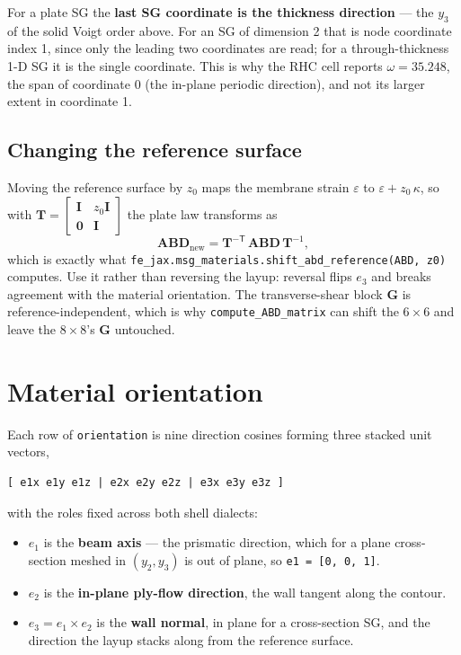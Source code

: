 For a plate SG the \textbf{last SG coordinate is the thickness direction} --- the
$y_3$ of the solid Voigt order above. For an SG of dimension 2 that is node
coordinate index 1, since only the leading two coordinates are read; for a
through-thickness 1-D SG it is the single coordinate. This is why the RHC cell
reports $\omega = 35.248$, the span of coordinate 0 (the in-plane periodic
direction), and not its larger extent in coordinate 1.

\subsection{Changing the reference surface}

Moving the reference surface by $z_0$ maps the membrane strain
$\varepsilon$ to $\varepsilon + z_0\,\kappa$, so with
$\mathbf{T} = \begin{bmatrix} \mathbf{I} & z_0\mathbf{I} \\ \mathbf{0} &
\mathbf{I}\end{bmatrix}$ the plate law transforms as
\[
\mathbf{ABD}_{\text{new}} = \mathbf{T}^{-\mathsf{T}}\,\mathbf{ABD}\,
\mathbf{T}^{-1},
\]
which is exactly what \texttt{fe\_jax.msg\_materials.shift\_abd\_reference(ABD,
z0)} computes. Use it rather than reversing the layup: reversal flips $e_3$ and
breaks agreement with the material orientation. The transverse-shear block
$\mathbf{G}$ is reference-independent, which is why
\texttt{compute\_ABD\_matrix} can shift the $6\times6$ and leave the $8\times8$'s
$\mathbf{G}$ untouched.

\section{Material orientation}
\label{sec:input-orientation}

Each row of \texttt{orientation} is nine direction cosines forming three
stacked unit vectors,

\begin{lstlisting}[style=shellst]
[ e1x e1y e1z | e2x e2y e2z | e3x e3y e3z ]
\end{lstlisting}

with the roles fixed across both shell dialects:

\begin{itemize}
\item $e_1$ is the \textbf{beam axis} --- the prismatic direction, which for a
  plane cross-section meshed in $(y_2, y_3)$ is out of plane, so
  \texttt{e1 = [0, 0, 1]}.
\item $e_2$ is the \textbf{in-plane ply-flow direction}, the wall tangent along
  the contour.
\item $e_3 = e_1 \times e_2$ is the \textbf{wall normal}, in plane for a
  cross-section SG, and the direction the layup stacks along from the reference
  surface.
\end{itemize}

